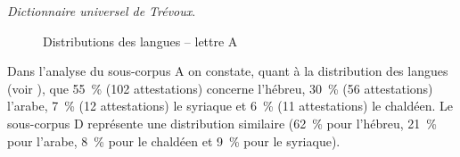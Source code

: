 \documentclass[output=paper,colorlinks,citecolor=brown,arabicfont,chinesefont,booklanguage=french]{langscibook}
\begin{document}
\begin{otherlanguage}{french}
\emph{Dictionnaire universel de Trévoux}.

\begin{figure}
\caption{Distributions des langues -- lettre A}
\label{fig:kassi:1}
\end{figure}

\largerpage
Dans l’analyse du sous-corpus A on constate, quant à la distribution des langues (voir ), que 55~\% (102 attestations) concerne l’hébreu, 30~\% (56 attestations) l’arabe, 7~\% (12 attestations) le syriaque et 6~\% (11 attestations) le chaldéen. Le sous-corpus D représente une distribution similaire (62~\% pour l’hébreu, 21~\% pour l’arabe, 8~\% pour le chaldéen et 9~\% pour le syriaque).\clearpage


\end{otherlanguage}
\end{document}
